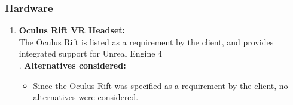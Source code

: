 \documentclass[a4paper,12pt]{report}
\begin{document}
\subsubsection{Hardware}
\begin{enumerate}
	\item \textbf{Oculus Rift VR Headset:}\\
		The Oculus Rift is listed as a requirement by the client, and provides integrated support for Unreal Engine 4\\.
		\textbf{Alternatives considered:}
		\begin{itemize}
			\item Since the Oculus Rift was specified as a requirement by the client, no alternatives were considered.
		\end{itemize}
\end{enumerate}
\newpage
%
%
\end{document}
